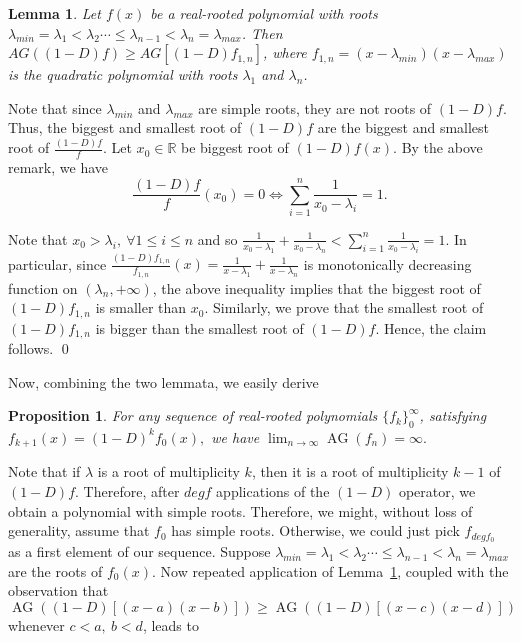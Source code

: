 \documentclass[11pt]{article}
\DeclareMathOperator{\AG}{AG}
\newtheorem{lemma}[theorem]{Lemma}
\newtheorem{proposition}[theorem]{Proposition}
\begin{document}
\begin{lemma}
\label{degree two - slowest movement}
Let $f(x)$ be a real-rooted polynomial with roots $\lambda_{min}=\lambda_1 < \lambda_2 \cdots \leq \lambda_{n-1} < \lambda_n = \lambda_{max}$. Then $AG((1-D)f) \geq AG[(1-D)f_{1,n}]$, where $f_{1,n} = (x - \lambda_{min})(x - \lambda_{max})$ is the quadratic polynomial with roots $\lambda_1$ and $\lambda_n$.
\end{lemma}
\proof Note that since $\lambda_{min}$ and $\lambda_{max}$ are simple roots, they are not roots of $(1-D)f$. Thus, the biggest and smallest root of $(1-D)f$ are the biggest and smallest root of $\frac{(1-D)f}{f}$. Let $x_0\in\mathbb{R}$ be biggest root of $(1-D)f(x)$. By the above remark, we have
\[\frac{(1-D)f}{f}(x_0) = 0 \Leftrightarrow \sum_{i=1}^n \frac{1}{x_0 - \lambda_i} = 1.\] 
 
Note that $x_0 > \lambda_i,~\forall 1\leq i \leq n$ and so $\frac{1}{x_0 - \lambda_1} + \frac{1}{x_0 - \lambda_n} < \sum_{i=1}^n \frac{1}{x_0 - \lambda_i} = 1.$ In particular, since $\frac{(1-D)f_{1,n}}{f_{1,n}}(x) = \frac{1}{x - \lambda_1} + \frac{1}{x - \lambda_n}$ is monotonically decreasing function on $(\lambda_n, +\infty)$, the above inequality implies that the biggest root of $(1-D)f_{1,n}$ is smaller than $x_0$. Similarly, we prove that the smallest root of $(1-D)f_{1,n}$ is bigger than the smallest root of $(1-D)f$. Hence, the claim follows. \qed

Now, combining the two lemmata, we easily derive

\begin{proposition}For any sequence of real-rooted polynomials $\{f_k\}_0^{\infty}$, satisfying $f_{k+1}(x) = (1-D)^k f_{0}(x),$ we have $\lim_{n\to \infty} \AG(f_n) =  \infty.$
\end{proposition}
\label{avg gap goes to infty}
\proof Note that if $\lambda$ is a root of multiplicity $k$, then it is a root of multiplicity $k-1$ of $(1-D)f$. Therefore, after $deg f$ applications of the $(1-D)$ operator, we obtain a polynomial with simple roots. Therefore, we might, without loss of generality, assume that $f_0$ has simple roots. Otherwise, we could just pick $f_{deg f_0}$ as a first element of our sequence. Suppose $\lambda_{min}=\lambda_1 < \lambda_2 \cdots \leq \lambda_{n-1} < \lambda_n = \lambda_{max}$ are the roots of $f_0(x)$. Now repeated application of Lemma~\ref{degree two - slowest movement}, coupled with the observation that $\AG((1-D)[(x-a)(x-b)]) \geq \AG((1-D)[(x-c)(x-d)])$ whenever $c < a,~b<d$, leads to
\end{document}
